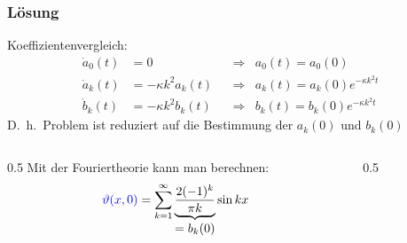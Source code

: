 \begin{frame}
\frametitle{Lösung}
Koeffizientenvergleich:
\begin{align*}
\dot a_0(t)&=0                 &&\Rightarrow& a_0(t) = a_0(0)                \\
\dot a_k(t)&=-\kappa k^2 a_k(t)&&\Rightarrow& a_k(t) = a_k(0)e^{-\kappa k^2t}\\
\dot b_k(t)&=-\kappa k^2 b_k(t)&&\Rightarrow& b_k(t) = b_k(0)e^{-\kappa k^2t}
\end{align*}
D.~h.~Problem ist reduziert auf die Bestimmung der $a_k(0)$ und $b_k(0)$
\begin{columns}
\begin{column}{0.5\hsize}
Mit der Fouriertheorie kann man berechnen:
\[
{\color{blue}\vartheta(x,0)}
=
\sum_{k=1}^\infty
\underbrace{
\frac{2(-1)^k}{\pi k}
}_{\displaystyle = b_k(0)} \sin kx
\]
\end{column}
\begin{column}{0.5\hsize}
\begin{center}
\end{center}
\end{column}
\end{columns}
\end{frame}

\def\waermeloesung{
\draw[domain=-180:180,samples=201,color=red]
	plot ({2*3.14159*\x/180},{3*(
	-(2/3.14159)*exp(-\t)*sin(\x)
	+(2/(2*3.14159))*exp(-4*\t)*sin(2*\x)
	-(2/(3*3.14159))*exp(-9*\t)*sin(3*\x)
	+(2/(4*3.14159))*exp(-16*\t)*sin(4*\x)
	-(2/(5*3.14159))*exp(-25*\t)*sin(5*\x)
	+(2/(6*3.14159))*exp(-36*\t)*sin(6*\x)
	-(2/(7*3.14159))*exp(-49*\t)*sin(7*\x)
	+(2/(8*3.14159))*exp(-64*\t)*sin(8*\x)
	-(2/(9*3.14159))*exp(-81*\t)*sin(9*\x)
	+(2/(10*3.14159))*exp(-100*\t)*sin(10*\x)
	-(2/(11*3.14159))*exp(-121*\t)*sin(11*\x)
	+(2/(12*3.14159))*exp(-144*\t)*sin(12*\x)
	-(2/(13*3.14159))*exp(-169*\t)*sin(13*\x)
	+(2/(14*3.14159))*exp(-196*\t)*sin(14*\x)
	-(2/(15*3.14159))*exp(-225*\t)*sin(15*\x)
	+(2/(16*3.14159))*exp(-256*\t)*sin(16*\x)
	)
});
}

